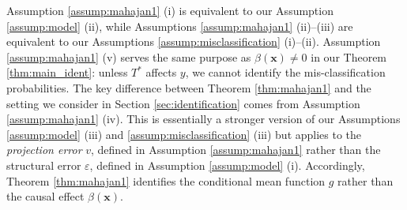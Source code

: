 Assumption \ref{assump:mahajan1} (i) is equivalent to our Assumption \ref{assump:model} (ii), while Assumptions \ref{assump:mahajan1} (ii)--(iii) are equivalent to our Assumptions \ref{assump:misclassification} (i)--(ii).
Assumption \ref{assump:mahajan1} (v) serves the same purpose as $\beta(\mathbf{x}) \neq 0$ in our Theorem \ref{thm:main_ident}: unless $T^*$ affects $y$, we cannot identify the mis-classification probabilities.
The key difference between Theorem \ref{thm:mahajan1} and the setting we consider in Section \ref{sec:identification} comes from Assumption \ref{assump:mahajan1} (iv). 
This is essentially a stronger version of our Assumptions \ref{assump:model} (iii) and \ref{assump:misclassification} (iii) but applies to the \emph{projection error} $v$, defined in Assumption \ref{assump:mahajan1} rather than the structural error $\varepsilon$, defined in Assumption \ref{assump:model} (i).
Accordingly, Theorem \ref{thm:mahajan1} identifies the conditional mean function $g$ rather than the causal effect $\beta(\mathbf{x})$.

